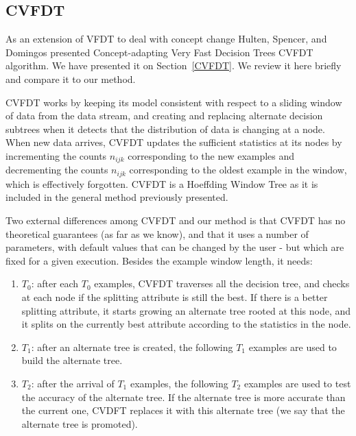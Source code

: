 \subsection{CVFDT}

As an extension of VFDT to deal with concept change Hulten, Spencer, and Domingos presented Concept-adapting 
Very Fast Decision Trees CVFDT \cite{hulten-mining} algorithm. We have presented it on Section~\ref{CVFDT}. 
We review it here briefly and 
compare it to our method.

CVFDT works by keeping its model consistent
with respect to a sliding window of data from the data stream, and creating and replacing 
alternate decision subtrees when it detects that the distribution of data is changing at a node.
When new data arrives, CVFDT updates the sufficient statistics at its nodes by incrementing the counts $n_{ijk}$ corresponding to the new examples and decrementing the counts $n_{ijk}$ corresponding to the oldest example in the window,
which is effectively forgotten.
CVFDT is a Hoeffding Window Tree as it is included in the general method previously presented. %

Two external differences among CVFDT and our method is that CVFDT has no 
theoretical guarantees (as far as we know), and 
that it uses  %
a number of parameters, with default values that can be changed by the user - but
which are fixed for a given execution. Besides the example window length, it needs:  

\begin{enumerate}

\item $T_0$: after each $T_0$ examples, CVFDT traverses all the decision tree, and checks at each node 
if the splitting attribute is still the best. If there is a better splitting attribute, it starts growing 
an alternate tree rooted at this node, and it splits on the currently best attribute 
according to the statistics in the node.
\item $T_1$: after an alternate tree is created, the following $T_1$ examples are used to build the alternate tree.
\item $T_2$: after the arrival of $T_1$ examples, the following $T_2$ examples are used to test the accuracy of the alternate tree. If the alternate tree is more accurate than the current one, 
CVDFT replaces it with this alternate tree (we say that the alternate tree is promoted). 
\end{enumerate}


